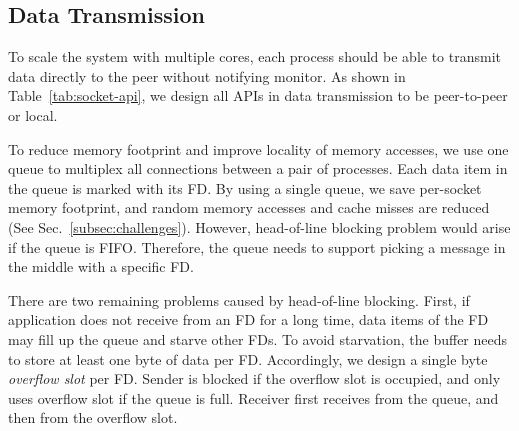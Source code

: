 \subsection{Data Transmission}
\label{subsec:data_trans}

To scale the system with multiple cores, each process should be able to transmit data directly to the peer without notifying monitor. As shown in Table~\ref{tab:socket-api}, we design all APIs in data transmission to be peer-to-peer or local.

To reduce memory footprint and improve locality of memory accesses, we use one queue to multiplex all connections between a pair of processes. Each data item in the queue is marked with its FD. By using a single queue, we save per-socket memory footprint, and random memory accesses and cache misses are reduced (See Sec.~\ref{subsec:challenges}). However, head-of-line blocking problem would arise if the queue is FIFO. 
Therefore, the queue needs to support picking a message in the middle with a specific FD. 

There are two remaining problems caused by head-of-line blocking. First, if application does not receive from an FD for a long time, data items of the FD may fill up the queue and starve other FDs. To avoid starvation, the buffer needs to store at least one byte of data per FD. Accordingly, we design a single byte \textit{overflow slot} per FD. Sender is blocked if the overflow slot is occupied, and only uses overflow slot if the queue is full. Receiver first receives from the queue, and then from the overflow slot. 

